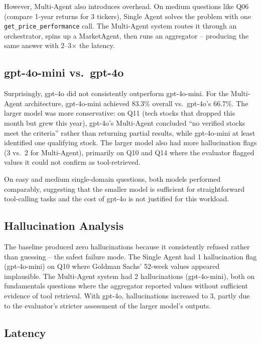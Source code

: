 \documentclass[conference]{IEEEtran}
\begin{document}
However, Multi-Agent also introduces overhead.  On medium questions like Q06 (compare
1-year returns for 3 tickers), Single Agent solves the problem with one
\texttt{get\_price\_performance} call.  The Multi-Agent system routes it through an
orchestrator, spins up a MarketAgent, then runs an aggregator -- producing the same
answer with 2--3$\times$ the latency.

\subsection{gpt-4o-mini vs.\ gpt-4o}

Surprisingly, gpt-4o did not consistently outperform gpt-4o-mini.  For the Multi-Agent
architecture, gpt-4o-mini achieved 83.3\% overall vs.\ gpt-4o's 66.7\%.  The larger model
was more conservative: on Q11 (tech stocks that dropped this month but grew this year),
gpt-4o's Multi-Agent concluded ``no verified stocks meet the criteria'' rather than
returning partial results, while gpt-4o-mini at least identified one qualifying stock.
The larger model also had more hallucination flags (3 vs.\ 2 for Multi-Agent), primarily
on Q10 and Q14 where the evaluator flagged values it could not confirm as tool-retrieved.

On easy and medium single-domain questions, both models performed comparably, suggesting
that the smaller model is sufficient for straightforward tool-calling tasks and the
cost of gpt-4o is not justified for this workload.

\subsection{Hallucination Analysis}

The baseline produced zero hallucinations because it consistently refused rather than
guessing -- the safest failure mode.  The Single Agent had 1 hallucination flag
(gpt-4o-mini) on Q10 where Goldman Sachs' 52-week values appeared implausible.
The Multi-Agent system had 2 hallucinations (gpt-4o-mini), both on fundamentals
questions where the aggregator reported values without sufficient evidence of tool
retrieval.  With gpt-4o, hallucinations increased to 3, partly due to the evaluator's
stricter assessment of the larger model's outputs.

\subsection{Latency}
\end{document}
